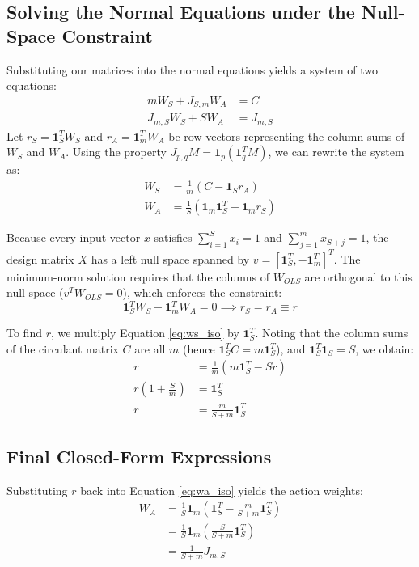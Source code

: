 \documentclass{article}
\begin{document}
\subsection{Solving the Normal Equations under the Null-Space Constraint}
Substituting our matrices into the normal equations yields a system of two equations:
\begin{align}
    m W_S + J_{S, m} W_A &= C \label{eq:sys1} \\
    J_{m, S} W_S + S W_A &= J_{m, S} \label{eq:sys2}
\end{align}
Let $r_S = \mathbf{1}_S^T W_S$ and $r_A = \mathbf{1}_m^T W_A$ be row vectors representing the column sums of $W_S$ and $W_A$. Using the property $J_{p,q} M = \mathbf{1}_p (\mathbf{1}_q^T M)$, we can rewrite the system as:
\begin{align}
    W_S &= \frac{1}{m}(C - \mathbf{1}_S r_A) \label{eq:ws_iso} \\
    W_A &= \frac{1}{S}(\mathbf{1}_m \mathbf{1}_S^T - \mathbf{1}_m r_S) \label{eq:wa_iso}
\end{align}

Because every input vector $x$ satisfies $\sum_{i=1}^S x_i = 1$ and $\sum_{j=1}^m x_{S+j} = 1$, the design matrix $X$ has a left null space spanned by $v = [\mathbf{1}_S^T, -\mathbf{1}_m^T]^T$. The minimum-norm solution requires that the columns of $W_{OLS}$ are orthogonal to this null space ($v^T W_{OLS} = 0$), which enforces the constraint:
\begin{equation}
    \mathbf{1}_S^T W_S - \mathbf{1}_m^T W_A = 0 \implies r_S = r_A \equiv r
\end{equation}

To find $r$, we multiply Equation \ref{eq:ws_iso} by $\mathbf{1}_S^T$. Noting that the column sums of the circulant matrix $C$ are all $m$ (hence $\mathbf{1}_S^T C = m \mathbf{1}_S^T$), and $\mathbf{1}_S^T \mathbf{1}_S = S$, we obtain:
\begin{align}
    r &= \frac{1}{m} (m \mathbf{1}_S^T - S r) \nonumber \\
    r \left(1 + \frac{S}{m}\right) &= \mathbf{1}_S^T \nonumber \\
    r &= \frac{m}{S+m} \mathbf{1}_S^T \label{eq:r_val}
\end{align}

\subsection{Final Closed-Form Expressions}
Substituting $r$ back into Equation \ref{eq:wa_iso} yields the action weights:
\begin{align}
    W_A &= \frac{1}{S} \mathbf{1}_m \left(\mathbf{1}_S^T - \frac{m}{S+m} \mathbf{1}_S^T\right) \nonumber \\
    &= \frac{1}{S} \mathbf{1}_m \left(\frac{S}{S+m} \mathbf{1}_S^T\right) \nonumber \\
    &= \frac{1}{S+m} J_{m, S}
\end{align}
\end{document}
